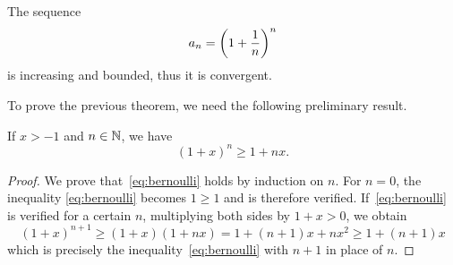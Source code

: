 \begin{theorem}
\mymark{**}%
\label{th:5767684}
The sequence
\[
  a_n = {\left( 1+\frac 1 n \right)}^n
\]
is increasing and bounded, thus it is convergent.
\end{theorem}
%
To prove the previous theorem, we need 
the following preliminary result.
%
\begin{theorem}
  \label{th:disuguaglianza_bernoulli}%
  \mymark{**}%
  If $x > -1$ and $n\in {\mathbb N}$, we have
  \begin{equation}
  \label{eq:bernoulli}
  (1+x)^n \ge 1 + nx.
  \end{equation}
  \end{theorem}
  \begin{proof}
  \mymark{**}
  We prove that~\eqref{eq:bernoulli}
  holds by induction on $n$.
  For $n=0$, the inequality \eqref{eq:bernoulli} becomes $1\ge 1$
  and is therefore verified.
  If~\eqref{eq:bernoulli}
  is verified for a certain $n$,
  multiplying both sides by $1+x > 0$, we obtain
  \[
  (1+x)^{n+1} \ge (1+x) (1+nx) = 1 + (n+1)x + n x^2
  \ge 1 + (n+1)x
  \]
  which is precisely the inequality~\eqref{eq:bernoulli}
  with $n+1$ in place of $n$.
  \end{proof}
%
